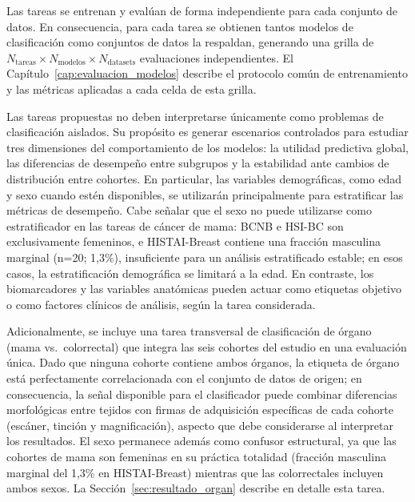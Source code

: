Las tareas se entrenan y evalúan de forma independiente para cada conjunto de datos. En consecuencia, para cada tarea se obtienen tantos modelos de clasificación como conjuntos de datos la respaldan, generando una grilla de $N_{\text{tareas}} \times N_{\text{modelos}} \times N_{\text{datasets}}$ evaluaciones independientes. El Capítulo~\ref{cap:evaluacion_modelos} describe el protocolo común de entrenamiento y las métricas aplicadas a cada celda de esta grilla.

Las tareas propuestas no deben interpretarse únicamente como problemas de clasificación aislados. Su propósito es generar escenarios controlados para estudiar tres dimensiones del comportamiento de los modelos: la utilidad predictiva global, las diferencias de desempeño entre subgrupos y la estabilidad ante cambios de distribución entre cohortes. En particular, las variables demográficas, como edad y sexo cuando estén disponibles, se utilizarán principalmente para estratificar las métricas de desempeño. Cabe señalar que el sexo no puede utilizarse como estratificador en las tareas de cáncer de mama: BCNB e HSI-BC son exclusivamente femeninos, e HISTAI-Breast contiene una fracción masculina marginal (n=20; 1,3\%), insuficiente para un análisis estratificado estable; en esos casos, la estratificación demográfica se limitará a la edad. En contraste, los biomarcadores y las variables anatómicas pueden actuar como etiquetas objetivo o como factores clínicos de análisis, según la tarea considerada.

Adicionalmente, se incluye una tarea transversal de clasificación de órgano (mama vs.\ colorrectal) que integra las seis cohortes del estudio en una evaluación única. Dado que ninguna cohorte contiene ambos órganos, la etiqueta de órgano está perfectamente correlacionada con el conjunto de datos de origen; en consecuencia, la señal disponible para el clasificador puede combinar diferencias morfológicas entre tejidos con firmas de adquisición específicas de cada cohorte (escáner, tinción y magnificación), aspecto que debe considerarse al interpretar los resultados. El sexo permanece además como confusor estructural, ya que las cohortes de mama son femeninas en su práctica totalidad (fracción masculina marginal del 1,3\% en HISTAI-Breast) mientras que las colorrectales incluyen ambos sexos. La Sección~\ref{sec:resultado_organ} describe en detalle esta tarea.


